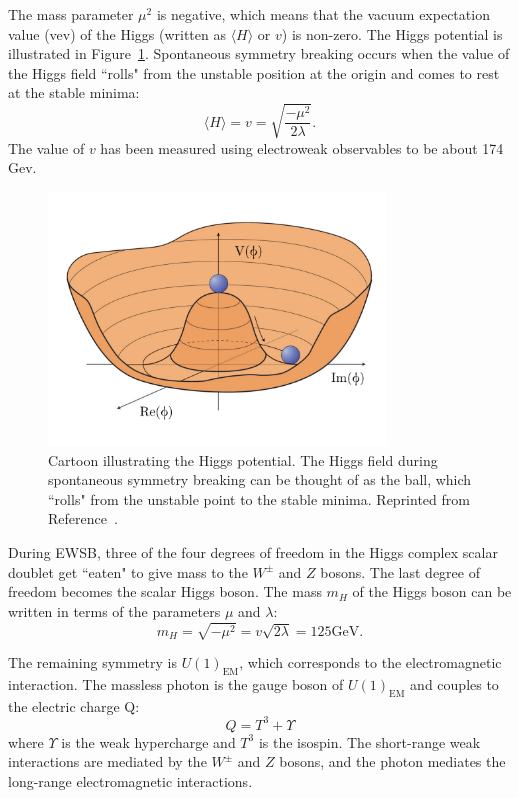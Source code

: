 The mass parameter $\mu^2$ is negative, which means that the vacuum expectation value (vev) of the Higgs (written as $\langle H \rangle$ or $v$) is non-zero. The Higgs potential is illustrated in Figure~\ref{fig:HiggsV}. Spontaneous symmetry breaking occurs when the value of the Higgs field ``rolls" from the unstable position at the origin and comes to rest at the stable minima:
\begin{equation}
\langle H \rangle= v = \sqrt{\frac{-\mu^2}{2\lambda}}.
\end{equation}
The value of $v$ has been measured using electroweak observables to be about 174 Gev. 

\begin{figure}[htbp]
    \centering
    \includegraphics[width=0.8\textwidth]{Figures/Theory/improvedMexicanHat.pdf}
    \caption{Cartoon illustrating the Higgs potential. The Higgs field during spontaneous symmetry breaking can be thought of as the ball, which ``rolls" from the unstable point to the stable minima.
    Reprinted from Reference~\cite{mexicanHat}.}
    \label{fig:HiggsV}
\end{figure}

During EWSB, three of the four degrees of freedom in the Higgs complex scalar doublet get ``eaten" to give mass to the $W^\pm$ and $Z$ bosons. The last degree of freedom becomes the scalar Higgs boson. The mass $m_H$ of the Higgs boson can be written in terms of the parameters $\mu$ and $\lambda$: 
\begin{equation}
m_H = \sqrt{-\mu^2} = v\sqrt{2\lambda} = 125 \mathrm{GeV}.
\label{equ:HiggsMass}
\end{equation}

The remaining symmetry is $U(1)_{\textrm{EM}}$, which corresponds to the electromagnetic interaction. The massless photon is the gauge boson of $U(1)_{\textrm{EM}}$ and couples to the electric charge Q: 
\begin{equation}
Q = T^3 + \Upsilon
\end{equation}
where $\Upsilon$ is the weak hypercharge and $T^3$ is the isospin. The short-range weak interactions are mediated by the $W^\pm$ and $Z$ bosons, and the photon mediates the long-range electromagnetic interactions.

